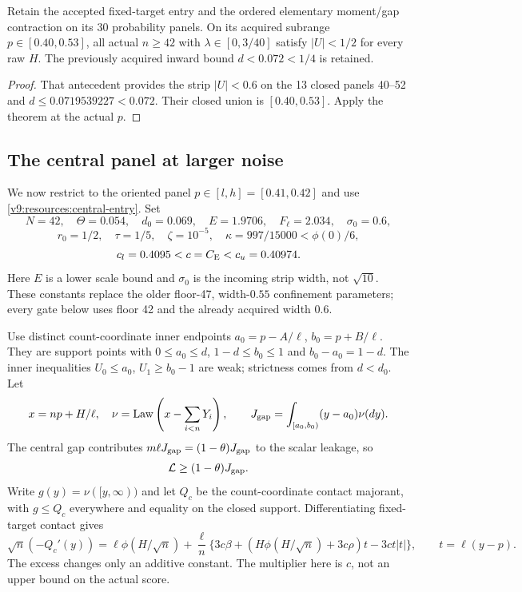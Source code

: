 \begin{corollary}\label{v9:confinement:application}
Retain the accepted fixed-target entry and the ordered elementary
moment/gap contraction on its 30 probability panels. On its acquired
subrange $p\in[0.40,0.53]$, all actual $n\ge42$ with
$\lambda\in[0,3/40]$ satisfy $|U|<1/2$ for every raw $H$.
The previously acquired inward bound $d<0.072<1/4$ is retained.
\end{corollary}
\begin{proof}
That antecedent provides the strip $|U|<0.6$ on the 13 closed panels
40--52 and $d\le0.0719539227<0.072$.
Their closed union is $[0.40,0.53]$. Apply the theorem at the actual $p$.
\end{proof}

\subsection{The central panel at larger noise}
\label{v9:confinement:high-setup}
We now restrict to the oriented panel $p\in[l,h]=[0.41,0.42]$ and use
\eqref{v9:resources:central-entry}. Set
\[
 N=42,\quad\Theta=0.054,\quad d_0=0.069,\quad
 E=1.9706,\quad F_\ell=2.034,\quad \sigma_0=0.6,
\]
\[
 r_0=1/2,\quad\tau=1/5,\quad\zeta=10^{-5},\quad
 \kappa=997/15000<\phi(0)/6,
\]
\[
 c_l=0.4095<c=C_{\mathrm E}<c_u=0.40974.
\]
Here $E$ is a lower scale bound and $\sigma_0$ is the incoming strip
width, not $\sqrt{10}$. These constants replace the older floor-47,
width-$0.55$ confinement parameters; every gate below uses floor 42
and the already acquired width $0.6$.

Use distinct count-coordinate inner endpoints
$a_0=p-A/\ell$, $b_0=p+B/\ell$.
They are support points with $0\le a_0\le d$, $1-d\le b_0\le1$ and
$b_0-a_0=1-d$. The inner inequalities $U_0\le a_0$, $U_1\ge b_0-1$
are weak; strictness comes from $d<d_0$. Let
\[
 x=np+H/\ell,\quad \nu=\operatorname{Law}\left(x-\sum_{i<n}Y_i\right),
 \qquad J_{\rm gap}=\int_{[a_0,b_0)}(y-a_0)\nu(dy).
\]
The central gap contributes $m\ell J_{\rm gap}=(1-\theta)J_{\rm gap}$
to the scalar leakage, so
\begin{equation}\label{v9:confinement:leakage}
 \mathcal L\ge(1-\theta)J_{\rm gap}.
\end{equation}
Write $g(y)=\nu([y,\infty))$ and let $Q_c$ be the count-coordinate
contact majorant, with $g\le Q_c$ everywhere and equality on the closed
support. Differentiating fixed-target contact gives
\begin{equation}\label{v9:confinement:contact-derivative}
 \sqrt n(-Q_c'(y))=\ell\phi(H/\sqrt n)
 +\frac\ell n\{3c\beta+(H\phi(H/\sqrt n)+3c\rho)t-3ct|t|\},
 \qquad t=\ell(y-p).
\end{equation}
The excess changes only an additive constant. The multiplier here is
$c$, not an upper bound on the actual score.

